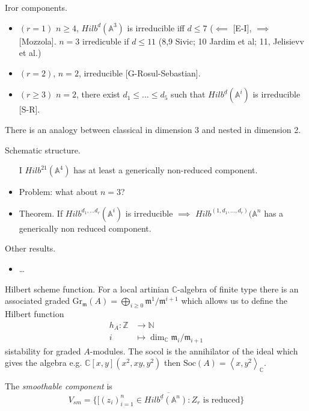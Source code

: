 {Iror components.
\begin{itemize}
\item $(r=1)$ $n\geq 4$, $Hilb^d(\mathbb{A}^3)$ 
is irreducible iff $d\leq 7$ ($\impliedby$ [E-I], $\implies $ [Mozzola].
$n=3$ irredicuble if $d \leq  11$ (8,9 Sivic; 10 Jardim et al; 11, Jelisievv et
al.)
\item $(r=2)$, $n=2$, irreducible [G-Rosul-Sebastian].
\item $(r \geq 3)$ $n=2$, there exist $d_1 \leq \ldots \leq d_5$
such that $Hilb^{\underline{d}}(\mathbb{A}^i)$ is irreducible [S-R].
\end{itemize}

There is an analogy between classical in dimension 3
and nested in dimension 2. 

Schematic structure.
\begin{itemize}
\item [I] $Hilb^{21}(\mathbb{A}^4)$ has at least a generically
non-reduced component.
\item Problem: what about $n=3$?
\item Theorem. If $Hilb^{d_1,\ldots d_r}(\mathbb{A}^i)$ is
irreducible $\implies $ $Hilb^{(1,d_1,\ldots,d_r)}(\mathbb{A}^n$
has a generically non reduced component.
\end{itemize}

Other results.
\begin{itemize}
\item …
\end{itemize}
Hilbert scheme function.
For a local artinian $\mathbb{C}$-algebra of
finite type there is an associated graded
$\text{Gr}_\mathfrak{m}(A)
=\bigoplus_{i \geq 0}\mathfrak{m}^1/\mathfrak{m}^{i+1}$ 
which allows us to define the Hilbert function
\begin{align*}
h_A: \mathbb{Z} &\longrightarrow \mathbb{N} \\
i &\longmapsto \dim_\mathbb{C} \mathfrak{m}_i/\mathfrak{m}_{i+1}
\end{align*}
sistability for graded $A$-modules.
The socol is the annihilator of
the ideal which gives the algebra
e.g. $\mathbb{C}[x,y](x^2,xy,y^2)$ then
$\text{Soc}(A)=\left<x,y^2\right>_\mathbb{C}$.

\medskip\noindent
\begin{definition}
\label{definition-smoothable-component}
The {\it smoothable component} is 
 $$
V_{sm}=\overline{\{[(z_i)_{i=1}^n \in Hilb^{\underline{d}}(\mathbb{A}^n):
Z_r\text{ is reduced}\}}
$$
\end{definition}

}
